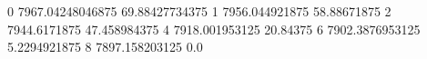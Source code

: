 0 7967.04248046875 69.88427734375
1 7956.044921875 58.88671875
2 7944.6171875 47.458984375
4 7918.001953125 20.84375
6 7902.3876953125 5.2294921875
8 7897.158203125 0.0
